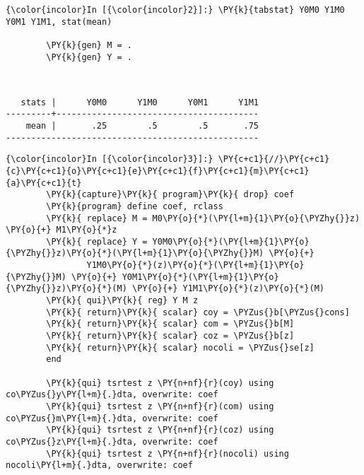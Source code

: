 \documentclass[11pt,notitlepage]{article}\usepackage[]{graphicx}\usepackage[]{color}
\makeatletter
\newenvironment{kframe}{%
 \def\at@end@of@kframe{}%
 \ifinner\ifhmode%
  \def\at@end@of@kframe{\end{minipage}}%
  \begin{minipage}{\columnwidth}%
 \fi\fi%
 \def\FrameCommand##1{\hskip\@totalleftmargin \hskip-\fboxsep
 \colorbox{shadecolor}{##1}\hskip-\fboxsep
     \hskip-\linewidth \hskip-\@totalleftmargin \hskip\columnwidth}%
 \MakeFramed {\advance\hsize-\width
   \@totalleftmargin\z@ \linewidth\hsize
   \@setminipage}}%
 {\par\unskip\endMakeFramed%
 \at@end@of@kframe}
\newenvironment{knitrout}{}{} %
\makeatother
\begin{document}
\begin{enumerate}[a)]
\begin{knitrout}
\begin{kframe}
    \begin{Verbatim}[commandchars=\\\{\}]
{\color{incolor}In [{\color{incolor}2}]:} \PY{k}{tabstat} Y0M0 Y1M0 Y0M1 Y1M1, stat(mean)	
        
        \PY{k}{gen} M = .
        \PY{k}{gen} Y = .
\end{Verbatim}

    \begin{Verbatim}[commandchars=\\\{\}]


   stats |      Y0M0      Y1M0      Y0M1      Y1M1
---------+----------------------------------------
    mean |       .25        .5        .5       .75
--------------------------------------------------

    \end{Verbatim}

    \begin{Verbatim}[commandchars=\\\{\}]
{\color{incolor}In [{\color{incolor}3}]:} \PY{c+c1}{//}\PY{c+c1}{c}\PY{c+c1}{o}\PY{c+c1}{e}\PY{c+c1}{f}\PY{c+c1}{m}\PY{c+c1}{a}\PY{c+c1}{t}
        \PY{k}{capture}\PY{k}{ program}\PY{k}{ drop} coef
        \PY{k}{program} define coef, rclass
        \PY{k}{	replace} M = M0\PY{o}{*}(\PY{l+m}{1}\PY{o}{\PYZhy{}}z) \PY{o}{+} M1\PY{o}{*}z
        \PY{k}{	replace} Y = Y0M0\PY{o}{*}(\PY{l+m}{1}\PY{o}{\PYZhy{}}z)\PY{o}{*}(\PY{l+m}{1}\PY{o}{\PYZhy{}}M) \PY{o}{+} 
        		Y1M0\PY{o}{*}(z)\PY{o}{*}(\PY{l+m}{1}\PY{o}{\PYZhy{}}M) \PY{o}{+} Y0M1\PY{o}{*}(\PY{l+m}{1}\PY{o}{\PYZhy{}}z)\PY{o}{*}(M) \PY{o}{+} Y1M1\PY{o}{*}(z)\PY{o}{*}(M)	
        \PY{k}{	qui}\PY{k}{ reg} Y M z
        \PY{k}{	return}\PY{k}{ scalar} coy = \PYZus{}b[\PYZus{}cons]
        \PY{k}{	return}\PY{k}{ scalar} com = \PYZus{}b[M]
        \PY{k}{	return}\PY{k}{ scalar} coz = \PYZus{}b[z]
        \PY{k}{	return}\PY{k}{ scalar} nocoli = \PYZus{}se[z]
        end
        
        \PY{k}{qui} tsrtest z \PY{n+nf}{r}(coy) using co\PYZus{}y\PY{l+m}{.}dta, overwrite: coef 
        \PY{k}{qui} tsrtest z \PY{n+nf}{r}(com) using co\PYZus{}m\PY{l+m}{.}dta, overwrite: coef
        \PY{k}{qui} tsrtest z \PY{n+nf}{r}(coz) using co\PYZus{}z\PY{l+m}{.}dta, overwrite: coef 
        \PY{k}{qui} tsrtest z \PY{n+nf}{r}(nocoli) using nocoli\PY{l+m}{.}dta, overwrite: coef
\end{Verbatim}


\end{kframe}
\end{knitrout}
\end{enumerate}
\end{document}
